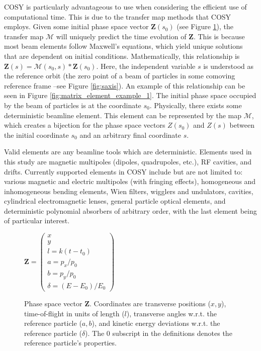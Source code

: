COSY is particularly advantageous to use when considering the efficient use of computational time. This is due to the transfer map methods that COSY employs. Given some initial phase space vector $\mathbf{Z}(s_0)$ (see Figure \ref{fig:phaseSpaceVector}), the transfer map $\mathcal{M}$ will uniquely predict the time evolution of $\mathbf{Z}$. This is because most beam elements follow Maxwell's equations, which yield unique solutions that are dependent on initial conditions. Mathematically, this relationship is $\mathbf{Z}(s)=\mathcal{M}(s_0 , s)*\mathbf{Z}(s_0)$. Here, the independent variable $s$ is understood as the reference orbit (the zero point of a beam of particles in some comoving reference frame --see Figure \ref{fig:saxis}). An example of this relationship can be seen in Figure \ref{fig:matrix_element_example_1}. The initial phase space occupied by the beam of particles is at the coordinate $s_0$. Physically, there exists some deterministic beamline element. This element can be represented by the map $\mathcal{M}$, which creates a bijection for the phase space vectors $Z(s_0)$ and $Z(s)$ between the initial coordinate $s_0$ and an arbitrary final coordinate $s$. 

Valid elements are any beamline tools which are deterministic. Elements used in this study are magnetic multipoles (dipoles, quadrupoles, etc.), RF cavities, and drifts. Currently supported elements in COSY include but are not limited to: various magnetic and electric multipoles (with fringing effects), homogeneous and inhomogeneous bending elements, Wien filters, wigglers and undulators, cavities, cylindrical electromagnetic lenses, general particle optical elements, and deterministic polynomial absorbers of arbitrary order, with the last element being of particular interest.

\begin{figure}[h!]
\centering
$\mathbf{Z}=
\begin{pmatrix}
x\\ y\\ l=k(t-t_0)\\a=p_x/p_0\\b=p_y/p_0\\  \delta = (E-E_0)/E_0
\end{pmatrix}
$
\caption{Phase space vector $\mathbf{Z}$. Coordinates are transverse positions ($x, y$), time-of-flight in units of length ($l$), transverse angles w.r.t. the reference particle ($a, b$), and kinetic energy deviations w.r.t. the reference particle ($\delta$). The $0$ subscript in the definitions denotes the reference particle's properties.}
\label{fig:phaseSpaceVector}
\end{figure}


